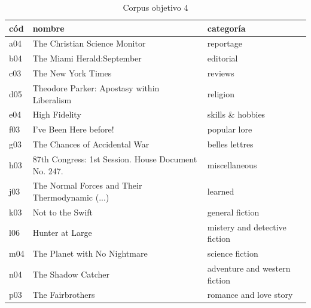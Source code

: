 \documentclass[12pt,letterpaper,twoside]{article}
\begin{document}
   \begin{table}[!ht]
      \centering
 \begin{tabular}{|l|l|l|}
 \hline
cód & nombre & categoría \\ \hline
        a04 & The Christian Science Monitor & reportage \\ \hline
        b04 & The Miami Herald:September & editorial \\ \hline
        c03 & The New York Times & reviews \\ \hline
        d05 & Theodore Parker: Apostasy within Liberalism & religion \\ \hline
        e04 & High Fidelity & skills \& hobbies \\ \hline
        f03 & I've Been Here before! & popular lore \\ \hline
        g03 & The Chances of Accidental War & belles lettres \\ \hline
        h03 & 87th Congress: 1st Session. House Document No. 247. & miscellaneous \\ \hline
        j03 & The Normal Forces and Their Thermodynamic (...) & learned \\ \hline
        k03 & Not to the Swift & general fiction \\ \hline
        l06 & Hunter at Large & mistery and detective fiction \\ \hline
        m04 & The Planet with No Nightmare & science fiction \\ \hline
        n04 & The Shadow Catcher & adventure and western fiction \\ \hline
        p03 & The Fairbrothers & romance and love story \\ \hline
     
      

      \end{tabular}
  \caption{Corpus objetivo 4}
  \label{tab:corpus_objetivo4}
  \end{table}
\end{document}
